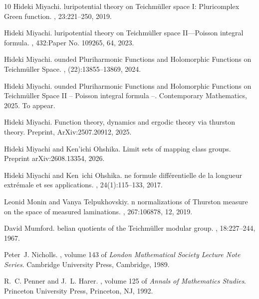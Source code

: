 \documentclass[dvipdfmx]{amsart}
\theoremstyle{remark}
\begin{document}
\begin{thebibliography}{10}
Hideki Miyachi.
luripotential theory on {T}eichm{\"u}ller space {I}: {P}luricomplex {G}reen function.
, 23:221--250, 2019.

Hideki Miyachi.
luripotential theory on {T}eichm{\"u}ller space {II}---{P}oisson integral formula.
, 432:Paper No. 109265, 64, 2023.

Hideki Miyachi.
ounded {P}luriharmonic {F}unctions and {H}olomorphic {F}unctions on {T}eichm{\"u}ller {S}pace.
, (22):13855--13869, 2024.

Hideki Miyachi.
ounded {P}luriharmonic {F}unctions and {H}olomorphic {F}unctions on {T}eichm{\"u}ller {S}pace {II} -- {P}oisson integral formula --.
\newblock Contemporary Mathematics, 2025.
\newblock To appear.

Hideki Miyachi.
\newblock Function theory, dynamics and ergodic theory via thurston theory.
\newblock Preprint, ArXiv:2507.20912, 2025.

Hideki Miyachi and Ken'ichi Ohshika.
\newblock Limit sets of mapping class groups.
\newblock Preprint arXiv:2608.13354, 2026.

Hideki Miyachi and Ken\textquotesingle~ichi Ohshika.
ne formule diff{\'e}rentielle de la longueur extr{\'e}male et ses applications.
, 24(1):115--133, 2017.

Leonid Monin and Vanya Telpukhovskiy.
n normalizations of {T}hurston measure on the space of measured laminations.
, 267:106878, 12, 2019.

David Mumford.
belian quotients of the {T}eichm{\"u}ller modular group.
, 18:227--244, 1967.

Peter~J. Nicholls.
, volume 143 of {\em London Mathematical Society Lecture Note Series}.
\newblock Cambridge University Press, Cambridge, 1989.

R.~C. Penner and J.~L. Harer.
, volume 125 of {\em Annals of Mathematics Studies}.
\newblock Princeton University Press, Princeton, NJ, 1992.


\end{thebibliography}
\end{document}
